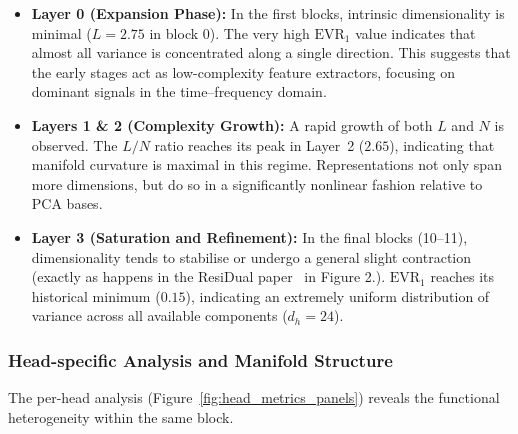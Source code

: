 \begin{itemize}
    \item \textbf{Layer 0 (Expansion Phase):} In the first blocks, intrinsic
    dimensionality is minimal ($L = 2.75$ in block 0). The very high
    $\mathrm{EVR}_1$ value indicates that almost all variance is
    concentrated along a single direction. This suggests that the early stages
    act as low-complexity feature extractors, focusing on dominant signals in
    the time--frequency domain.
    \item \textbf{Layers 1 \& 2 (Complexity Growth):} A rapid growth of
    both $L$ and $N$ is observed. The $L/N$ ratio reaches its peak in
    Layer~2 ($2.65$), indicating that manifold curvature is maximal in this
    regime. Representations not only span more dimensions, but do so in a
    significantly nonlinear fashion relative to PCA bases.
    \item \textbf{Layer 3 (Saturation and Refinement):} In the final blocks
    (10--11), dimensionality tends to stabilise or undergo a general slight
    contraction (exactly as happens in the ResiDual paper~\cite{residual2024} in Figure 2.). $\mathrm{EVR}_1$ reaches its historical
    minimum ($0.15$), indicating an extremely uniform distribution of variance
    across all available components ($d_h=24$).
\end{itemize}
 
\subsubsection{Head-specific Analysis and Manifold Structure}
 
The per-head analysis (Figure~\ref{fig:head_metrics_panels}) reveals the
functional heterogeneity within the same block.
 
